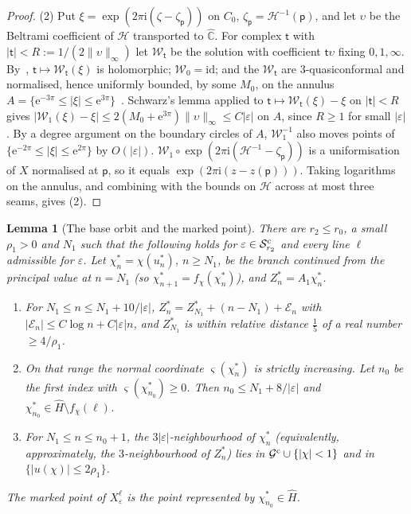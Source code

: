 \documentclass[11pt]{amsart}
\newtheorem{lemma}[theorem]{Lemma}
\theoremstyle{definition}
\newcommand{\eee}{\mathrm{e}}
\newcommand{\ii}{\mathrm{i}}
\begin{document}
\begin{proof}
(2) Put $\xi=\exp(2\pi\ii(\zeta-\zeta_{\mathsf p}))$ on $C_0$, $\zeta_{\mathsf p}=\mathcal H^{-1}(\mathsf p)$, and
let $\upsilon$ be the Beltrami coefficient of $\mathcal H$ transported to $\hat{\mathbb C}$.  For
complex $\mathsf t$ with $|\mathsf t|<R:=1/(2\|\upsilon\|_\infty)$ let $\mathcal W_{\mathsf t}$ be the solution
with coefficient $\mathsf t\upsilon$ fixing $0,1,\infty$.  By~\cite[Thm.~11]{AhlforsBers1960},
$\mathsf t\mapsto\mathcal W_{\mathsf t}(\xi)$ is holomorphic; $\mathcal W_0=\mathrm{id}$; and the $\mathcal W_{\mathsf t}$ are
$3$-quasiconformal and normalised, hence uniformly bounded, by some $M_0$, on
the annulus $A=\{\eee^{-3\pi}\le|\xi|\le\eee^{3\pi}\}$~\cite[Ch.~II]{LehtoVirtanen}.
Schwarz's lemma applied to $\mathsf t\mapsto\mathcal W_{\mathsf t}(\xi)-\xi$ on $|\mathsf t|<R$ gives
$|\mathcal W_1(\xi)-\xi|\le2(M_0+\eee^{3\pi})\|\upsilon\|_\infty\le C|\varepsilon|$ on $A$, since $R\ge1$
for small $|\varepsilon|$.  By a degree argument on the boundary circles of $A$,
$\mathcal W_1^{-1}$ also moves points of $\{\eee^{-2\pi}\le|\xi|\le\eee^{2\pi}\}$ by $O(|\varepsilon|)$.
$\mathcal W_1\circ\exp(2\pi\ii(\mathcal H^{-1}-\zeta_{\mathsf p}))$ is a uniformisation of $X$ normalised at
$\mathsf p$, so it equals $\exp(2\pi\ii(z-z(\mathsf p)))$.  Taking logarithms on the
annulus, and combining with the bounds on $\mathcal H$ across at most three seams,
gives (2).
\end{proof}

\begin{lemma}[The base orbit and the marked point]\label{lem:cusp-base}
There are $r_2\le r_0$, a small $\rho_1>0$ and $N_1$ such that the following holds
for $\varepsilon\in\mathcal S^{\rm c}_{r_2}$ and every line $\ell$ admissible for $\varepsilon$.  Let
$\chi^*_n=\chi(u^*_n)$, $n\ge N_1$, be the branch continued from the principal
value at $n=N_1$ (so $\chi^*_{n+1}=f_\chi(\chi^*_n)$), and $Z^*_n=A_1\chi^*_n$.
\begin{enumerate}
\item For $N_1\le n\le N_1+10/|\varepsilon|$,
  $Z^*_n=Z^*_{N_1}+(n-N_1)+\mathcal E_n$ with $|\mathcal E_n|\le C\log n+C|\varepsilon|n$, and
  $Z^*_{N_1}$ is within relative distance $\tfrac15$ of a real number $\ge4/\rho_1$.
\item On that range the normal coordinate $\varsigma(\chi^*_n)$ is strictly
  increasing.  Let $n_0$ be the first index with $\varsigma(\chi^*_{n_0})\ge0$.  Then
  $n_0\le N_1+8/|\varepsilon|$ and $\chi^*_{n_0}\in\hat H\setminus f_\chi(\ell)$.
\item For $N_1\le n\le n_0+1$, the $3|\varepsilon|$-neighbourhood of $\chi^*_n$ (equivalently,
  approximately, the $3$-neighbourhood of $Z^*_n$) lies in $\mathcal G^{\rm c}\cup\{|\chi|<1\}$
  and in $\{|u(\chi)|\le2\rho_1\}$.
\end{enumerate}
The \emph{marked point} of $X^\ell_\varepsilon$ is the point represented by
$\chi^*_{n_0}\in\hat H$.
\end{lemma}
\end{document}
